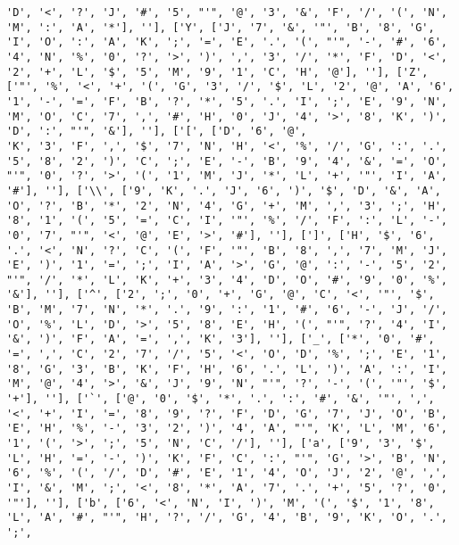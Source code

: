 \documentclass{article}
\begin{document}
\begin{verbatim}
'D', '<', '?', 'J', '#', '5', "'", '@', '3', '&', 'F', '/', '(', 'N', 'M', ':', 'A', '*'], ''], ['Y', ['J', '7', '&', '"', 'B', '8', 'G', 'I', 'O', ':', 'A', 'K', ';', '=', 'E', '.', '(', "'", '-', '#', '6', '4', 'N', '%', '0', '?', '>', ')', ',', '3', '/', '*', 'F', 'D', '<', '2', '+', 'L', '$', '5', 'M', '9', '1', 'C', 'H', '@'], ''], ['Z', ['"', '%', '<', '+', '(', 'G', '3', '/', '$', 'L', '2', '@', 'A', '6', '1', '-', '=', 'F', 'B', '?', '*', '5', '.', 'I', ';', 'E', '9', 'N', 'M', 'O', 'C', '7', ',', '#', 'H', '0', 'J', '4', '>', '8', 'K', ')', 'D', ':', "'", '&'], ''], ['[', ['D', '6', '@', 
'K', '3', 'F', ',', '$', '7', 'N', 'H', '<', '%', '/', 'G', ':', '.', '5', '8', '2', ')', 'C', ';', 'E', '-', 'B', '9', '4', '&', '=', 'O', "'", '0', '?', '>', '(', '1', 'M', 'J', '*', 'L', '+', '"', 'I', 'A', '#'], ''], ['\\', ['9', 'K', '.', 'J', '6', ')', '$', 'D', '&', 'A', 'O', '?', 'B', '*', '2', 'N', '4', 'G', '+', 'M', ',', '3', ';', 'H', '8', '1', '(', '5', '=', 'C', 'I', '"', '%', '/', 'F', ':', 'L', '-', '0', '7', "'", '<', '@', 'E', '>', '#'], ''], [']', ['H', '$', '6', '.', '<', 'N', '?', 'C', '(', 'F', '"', 'B', '8', ',', '7', 'M', 'J', 'E', ')', '1', '=', ';', 'I', 'A', '>', 'G', '@', ':', '-', '5', '2', "'", '/', '*', 'L', 'K', '+', '3', '4', 'D', 'O', '#', '9', '0', '%', '&'], ''], ['^', ['2', ';', '0', '+', 'G', '@', 'C', '<', '"', '$', 'B', 'M', '7', 'N', '*', '.', '9', ':', '1', '#', '6', '-', 'J', '/', 'O', '%', 'L', 'D', '>', '5', '8', 'E', 'H', '(', "'", '?', '4', 'I', '&', ')', 'F', 'A', '=', ',', 'K', '3'], ''], ['_', ['*', '0', '#', '=', ',', 'C', '2', '7', '/', '5', '<', 'O', 'D', '%', ';', 'E', '1', '8', 'G', '3', 'B', 'K', 'F', 'H', '6', '.', 'L', ')', 'A', ':', 'I', 'M', '@', '4', '>', '&', 'J', '9', 'N', "'", '?', '-', '(', '"', '$', '+'], ''], ['`', ['@', '0', '$', '*', '.', ':', '#', '&', '"', ',', '<', '+', 'I', '=', '8', '9', '?', 'F', 'D', 'G', '7', 'J', 'O', 'B', 'E', 'H', '%', '-', '3', '2', ')', '4', 'A', "'", 'K', 'L', 'M', '6', '1', '(', '>', ';', '5', 'N', 'C', '/'], ''], ['a', ['9', '3', '$', 'L', 'H', '=', '-', ')', 'K', 'F', 'C', ':', "'", 'G', '>', 'B', 'N', '6', '%', '(', '/', 'D', '#', 'E', '1', '4', 'O', 'J', '2', '@', ',', 'I', '&', 'M', ';', '<', '8', '*', 'A', '7', '.', '+', '5', '?', '0', '"'], ''], ['b', ['6', '<', 'N', 'I', ')', 'M', '(', '$', '1', '8', 'L', 'A', '#', "'", 'H', '?', '/', 'G', '4', 'B', '9', 'K', 'O', '.', ';', 

\end{verbatim}
\end{document}
